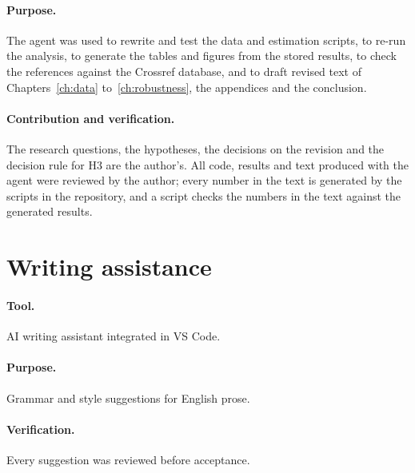 \paragraph{Purpose.} The agent was used to rewrite and test the data and
estimation scripts, to re-run the analysis, to generate the tables and
figures from the stored results, to check the references against the
Crossref database, and to draft revised text of Chapters~\ref{ch:data}
to~\ref{ch:robustness}, the appendices and the conclusion.

\paragraph{Contribution and verification.} The research questions, the
hypotheses, the decisions on the revision and the decision rule for H3 are
the author's. All code, results and text produced with the agent were
reviewed by the author; every number in the text is generated by the
scripts in the repository, and a script checks the numbers in the text
against the generated results.

\section*{Writing assistance}

\paragraph{Tool.} AI writing assistant integrated in VS Code.

\paragraph{Purpose.} Grammar and style suggestions for English prose.

\paragraph{Verification.} Every suggestion was reviewed before acceptance.
